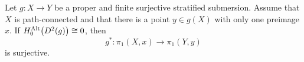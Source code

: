 \documentclass[a4paper,12pt]{amsart}
\begin{document}
\begin{lemma}\label{lem:houstonpi1}
Let $g:X\to Y$ be a proper and finite surjective stratified submersion. Assume that $X$ is path-connected and that there is a point $y\in g(X)$ with only one preimage $x$. If $H_0^{\textnormal{Alt}}\big(D^2(g)\big)\cong0$, then
\[g^*: \pi_1(X,x)\to \pi_1(Y,y)\]
is surjective.
\end{lemma}
\end{document}
